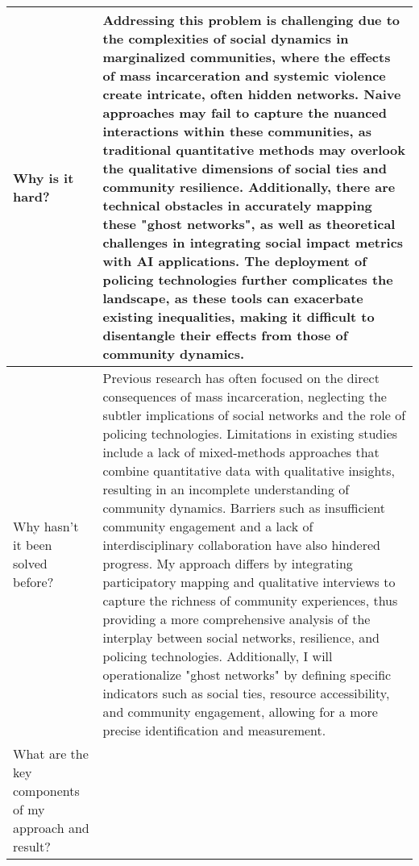 \begin{table*}[htbp]
\begin{tabular}{p{3.5cm}p{12cm}}
Why is it hard? & 
Addressing this problem is challenging due to the complexities of social dynamics in marginalized communities, where the effects of mass incarceration and systemic violence create intricate, often hidden networks. Naive approaches may fail to capture the nuanced interactions within these communities, as traditional quantitative methods may overlook the qualitative dimensions of social ties and community resilience. Additionally, there are technical obstacles in accurately mapping these "ghost networks", as well as theoretical challenges in integrating social impact metrics with AI applications. The deployment of policing technologies further complicates the landscape, as these tools can exacerbate existing inequalities, making it difficult to disentangle their effects from those of community dynamics.\\ \midrule
Why hasn't it been solved before? & 
Previous research has often focused on the direct consequences of mass incarceration, neglecting the subtler implications of social networks and the role of policing technologies. Limitations in existing studies include a lack of mixed-methods approaches that combine quantitative data with qualitative insights, resulting in an incomplete understanding of community dynamics. Barriers such as insufficient community engagement and a lack of interdisciplinary collaboration have also hindered progress. My approach differs by integrating participatory mapping and qualitative interviews to capture the richness of community experiences, thus providing a more comprehensive analysis of the interplay between social networks, resilience, and policing technologies. Additionally, I will operationalize "ghost networks" by defining specific indicators such as social ties, resource accessibility, and community engagement, allowing for a more precise identification and measurement.\\ \midrule
What are the key components of my approach and result? & 

\end{tabular}
\end{table*}
